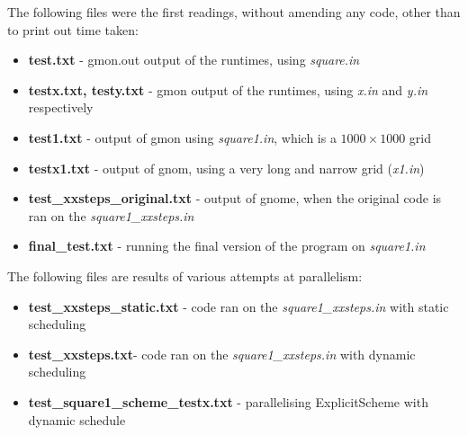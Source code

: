 \documentclass[11pt,journal]{IEEEtran}
\begin{document}
	The following files were the first readings, without amending any code, other than to print out time taken:
	
	\begin{itemize}
		\item \textbf{test.txt} - gmon.out output of the runtimes, using \emph{square.in}
		\item \textbf{testx.txt, testy.txt} - gmon output of the runtimes, using \emph{x.in} and \emph{y.in} respectively
		\item \textbf{test1.txt} - output of gmon using \emph{square1.in}, which is a $1000 \times 1000$ grid
		\item \textbf{testx1.txt} - output of gnom, using a very long and narrow grid (\emph{x1.in})
		\item \textbf{test\_xxsteps\_original.txt} - output of gnome, when the original code is ran on the \emph{square1\_xxsteps.in}
		\item \textbf{final\_test.txt} - running the final version of the program on \emph{square1.in}
		
	
	\end{itemize}

	The following files are results of various attempts at parallelism:
	\begin{itemize}
		\item \textbf{test\_xxsteps\_static.txt} - code ran on the \emph{square1\_xxsteps.in} with static scheduling
		\item \textbf{test\_xxsteps.txt}- code ran on the \emph{square1\_xxsteps.in} with dynamic scheduling
		\item \textbf{test\_square1\_scheme\_testx.txt} - parallelising ExplicitScheme with dynamic schedule
		
	\end{itemize}
\end{document}
